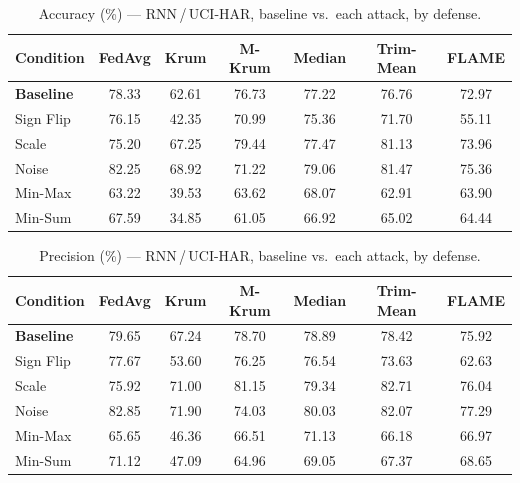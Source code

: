 \begin{table}[t]
\centering
\caption{Accuracy (\%) --- RNN\,/\,UCI-HAR, baseline vs.\ each attack, by defense.}
\label{tab:rnn_accuracy}
\footnotesize
\begin{tabular}{lcccccc}
\toprule
Condition & FedAvg & Krum & M-Krum & Median & Trim-Mean & FLAME \\
\midrule
\textbf{Baseline} & 78.33 & 62.61 & 76.73 & 77.22 & 76.76 & 72.97 \\
\midrule
Sign Flip & 76.15 & 42.35 & 70.99 & 75.36 & 71.70 & 55.11 \\
Scale & 75.20 & 67.25 & 79.44 & 77.47 & 81.13 & 73.96 \\
Noise & 82.25 & 68.92 & 71.22 & 79.06 & 81.47 & 75.36 \\
Min-Max & 63.22 & 39.53 & 63.62 & 68.07 & 62.91 & 63.90 \\
Min-Sum & 67.59 & 34.85 & 61.05 & 66.92 & 65.02 & 64.44 \\
\bottomrule
\end{tabular}
\end{table}

\begin{table}[t]
\centering
\caption{Precision (\%) --- RNN\,/\,UCI-HAR, baseline vs.\ each attack, by defense.}
\label{tab:rnn_precision}
\footnotesize
\begin{tabular}{lcccccc}
\toprule
Condition & FedAvg & Krum & M-Krum & Median & Trim-Mean & FLAME \\
\midrule
\textbf{Baseline} & 79.65 & 67.24 & 78.70 & 78.89 & 78.42 & 75.92 \\
\midrule
Sign Flip & 77.67 & 53.60 & 76.25 & 76.54 & 73.63 & 62.63 \\
Scale & 75.92 & 71.00 & 81.15 & 79.34 & 82.71 & 76.04 \\
Noise & 82.85 & 71.90 & 74.03 & 80.03 & 82.07 & 77.29 \\
Min-Max & 65.65 & 46.36 & 66.51 & 71.13 & 66.18 & 66.97 \\
Min-Sum & 71.12 & 47.09 & 64.96 & 69.05 & 67.37 & 68.65 \\
\bottomrule
\end{tabular}
\end{table}

